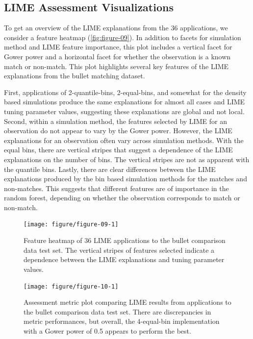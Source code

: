 \documentclass[AMS,STIX2COL]{WileyNJD-v2}\usepackage[]{graphicx}\usepackage[]{color}
\newenvironment{knitrout}{}{} %
\begin{document}
\subsection{LIME Assessment Visualizations} \label{bullet-assess-ex}

To get an overview of the LIME explanations from the 36 applications, we consider a feature heatmap (\autoref{fig:figure-09}). In addition to facets for simulation method and LIME feature importance, this plot includes a vertical facet for Gower power and a horizontal facet for whether the observation is a known match or non-match. This plot highlights several key features of the LIME explanations from the bullet matching dataset.

First, applications of 2-quantile-bins, 2-equal-bins, and somewhat for the density based simulations produce the same explanations for almost all cases and LIME tuning parameter values, suggesting these explanations are global and not local. Second, within a simulation method, the features selected by LIME for an observation do not appear to vary by the Gower power. However, the LIME explanations for an observation often vary across simulation methods. With the equal bins, there are vertical stripes that suggest a dependence of the LIME explanations on the number of bins. The vertical stripes are not as apparent with the quantile bins. Lastly, there are clear differences between the LIME explanations produced by the bin based simulation methods for the matches and non-matches. This suggests that different features are of importance in the random forest, depending on whether the observation corresponds to match or non-match.

\begin{figure}[!thp]
\begin{knitrout}
\color{fgcolor}

{\centering \texttt{[image: figure/figure-09-1]} 

}


\end{knitrout}
\caption{Feature heatmap of 36 LIME applications to the bullet comparison data test set. The vertical stripes of features selected indicate a dependence between the LIME explanations and tuning parameter values.}
\label{fig:figure-09}

\vspace*{\floatsep}

\begin{knitrout}
\color{fgcolor}

{\centering \texttt{[image: figure/figure-10-1]} 

}


\end{knitrout}
\caption{Assessment metric plot comparing LIME results from applications to the bullet comparison data test set. There are discrepancies in metric performances, but overall, the 4-equal-bin implementation with a Gower power of 0.5 appears to perform the best.}
\label{fig:figure-10}
\end{figure}
\end{document}
